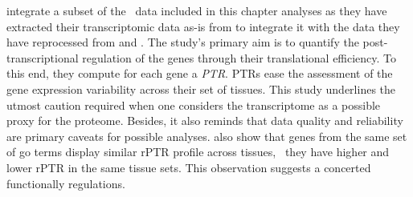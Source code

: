 \citet{Franks2017-bp} integrate a subset of the \uhlen\ data included
in this chapter analyses
as they have extracted their transcriptomic data as-is from \citet{Uhlen2014}
to integrate it with the data they have reprocessed
from \citet{PandeyData} and \citet{KusterData}.
The study's primary aim is
to quantify the post-transcriptional regulation of the genes
through their translational efficiency.
To this end, they compute for each gene a \emph{\gls{PTR}}.
\glspl{PTR} ease the assessment of the gene expression variability
across their set of tissues.
This study underlines the utmost caution required
when one considers the transcriptome as a possible proxy for the proteome.
Besides, it also reminds that data quality and reliability are primary caveats
for possible analyses.
\citet{Franks2017-bp} also show that genes from the same set of \gls{go} terms
display similar \gls{rPTR} profile across tissues,
\ie\ they have higher and lower \gls{rPTR} in the same tissue sets.
This observation suggests a concerted functionally regulations.

